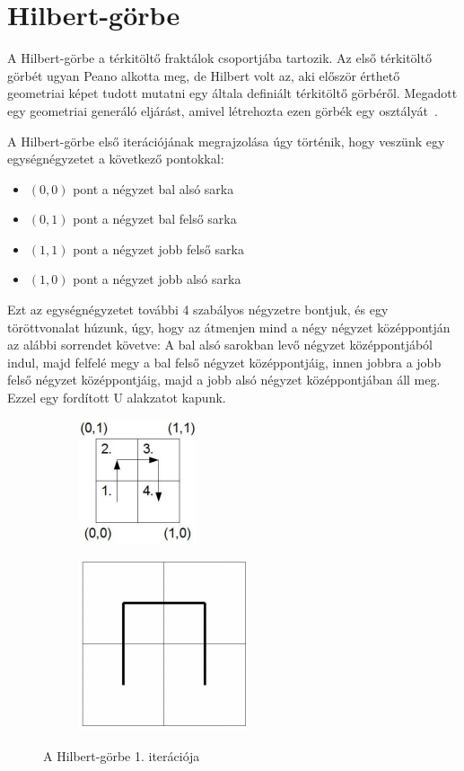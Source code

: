 \section{Hilbert-görbe}
A Hilbert-görbe a térkitöltő fraktálok csoportjába tartozik. Az első térkitöltő görbét ugyan Peano alkotta meg, de Hilbert volt az, aki először érthető geometriai képet tudott mutatni egy általa definiált térkitöltő görbéről. Megadott egy geometriai generáló eljárást, amivel létrehozta ezen görbék egy osztályát~\cite{hilbert-wiki}. 
\par A Hilbert-görbe első iterációjának megrajzolása úgy történik, hogy veszünk egy egységnégyzetet a következő pontokkal:
\begin{itemize}
	\item $(0, 0)$ pont a négyzet bal alsó sarka
	\item $(0, 1)$ pont a négyzet bal felső sarka
	\item $(1, 1)$ pont a négyzet jobb felső sarka
	\item $(1, 0)$ pont a négyzet jobb alsó sarka
\end{itemize}
Ezt az egységnégyzetet további 4 szabályos négyzetre bontjuk, és egy töröttvonalat húzunk, úgy, hogy az átmenjen mind a négy négyzet középpontján az alábbi sorrendet követve: A bal alsó sarokban levő négyzet középpontjából indul, majd felfelé megy a bal felső négyzet középpontjáig, innen jobbra a jobb felső négyzet középpontjáig, majd a jobb alsó négyzet középpontjában áll meg. Ezzel egy fordított U alakzatot kapunk. 
\begin{figure}[!ht]
	\centering
	\begin{subfigure}{.5\textwidth}
		\centering
		\includegraphics[width=.4\linewidth]{img/HilbertCurve1-1}
	\end{subfigure}%
	\begin{subfigure}{.5\textwidth}
		\centering
		\includegraphics[width=.4\linewidth]{img/HilbertCurve1-2}
	\end{subfigure}
	\caption{A Hilbert-görbe 1. iterációja}
	\label{fig:test}
\end{figure}
